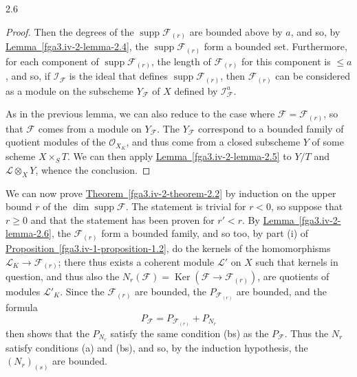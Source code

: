 \begin{lemma}{2.6}
\begin{proof}
      Then the degrees of the \(\operatorname {supp}\mathscr {F}_{(r)}\) are bounded above by \(a\), and so, by \hyperref[fga3.iv-2-lemma-2.4]{Lemma~\ref*{fga3.iv-2-lemma-2.4}}, the \(\operatorname {supp}\mathscr {F}_{(r)}\) form a bounded set.
      Furthermore, for each component of \(\operatorname {supp}\mathscr {F}_{(r)}\), the length of \(\mathscr {F}_{(r)}\) for this component is \(\leqslant  a\), and so, if \(\mathscr {I}_\mathscr {F}\) is the ideal that defines \(\operatorname {supp}\mathscr {F}_{(r)}\), then \(\mathscr {F}_{(r)}\) can be considered as a module on the subscheme \(Y_\mathscr {F}\) of \(X\) defined by \(\mathscr {I}_\mathscr {F}^a\).
      
      As in the previous lemma, we can also reduce to the case where \(\mathscr {F}=\mathscr {F}_{(r)}\), so that \(\mathscr {F}\) comes from a module on \(Y_\mathscr {F}\).
      The \(Y_\mathscr {F}\) correspond to a bounded family of quotient modules of the \(\mathcal {O}_{X_K}\), and thus come from a closed subscheme \(Y\) of some scheme \(X\times _S T\).
      We can then apply \hyperref[fga3.iv-2-lemma-2.5]{Lemma~\ref*{fga3.iv-2-lemma-2.5}} to \(Y/T\) and \(\mathscr {L}\otimes _X Y\), whence the conclusion.\end{proof}\end{lemma}\par{}We can now prove \hyperref[fga3.iv-2-theorem-2.2]{Theorem~\ref*{fga3.iv-2-theorem-2.2}} by induction on the upper bound \(r\) of the \(\dim \operatorname {supp}\mathscr {F}\).
  The statement is trivial for \(r<0\), so suppose that \(r\geqslant 0\) and that the statement has been proven for \(r'<r\).
  By \hyperref[fga3.iv-2-lemma-2.6]{Lemma~\ref*{fga3.iv-2-lemma-2.6}}, the \(\mathscr {F}_{(r)}\) form a bounded family, and so too, by part (i) of \hyperref[fga3.iv-1-proposition-1.2]{Proposition~\ref*{fga3.iv-1-proposition-1.2}}, do the kernels of the homomorphisms \(\mathscr {L}_K\to \mathscr {F}_{(r)}\);
  there thus exists a coherent module \(\mathscr {L}'\) on \(X\) such that kernels in question, and thus also the \(N_r(\mathscr {F})=\operatorname {Ker}(\mathscr {F}\to \mathscr {F}_{(r)})\), are quotients of modules \(\mathscr {L}'_K\).
  Since the \(\mathscr {F}_{(r)}\) are bounded, the \(P_{\mathscr {F}_{(r)}}\) are bounded, and the formula
  \[     P_\mathscr {F}     = P_{\mathscr {F}_{(r)}} + P_{N_r}   \]
  then shows that the \(P_{N_r}\) satisfy the same condition (bs) as the \(P_\mathscr {F}\).
  Thus the \(N_r\) satisfy conditions (a) and (bs), and so, by the induction hypothesis, the \((N_r)_{(s)}\) are bounded.
